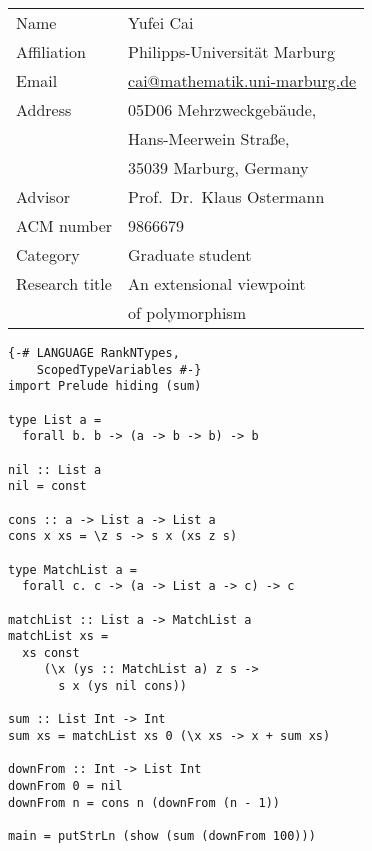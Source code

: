 \documentclass{amsart}
\begin{document}
\thispagestyle{empty}



\def\CT0{$\text{CT}_0$}
\def\DoCap{\captionsetup{justification=raggedright,margin=0pt}}

\def\OK{\\[5pt]}

\def\LeftWidth{0.5\textwidth}
\def\RightWidth{0.5\textwidth}

{
\begin{minipage}{\LeftWidth}
\begin{tabular}{ll}
Name & Yufei Cai\OK
Affiliation & Philipps-Universit\"at Marburg\OK
Email & \url{cai@mathematik.uni-marburg.de} \OK
Address & 05D06 Mehrzweckgeb\"aude,\\
              & Hans-Meerwein Stra\ss e,\\
              & 35039 Marburg, Germany \OK
Advisor & Prof.\ Dr.\ Klaus Ostermann \OK
ACM number & 9866679 \OK
Category & Graduate student \OK
Research title & An extensional viewpoint\\ &of polymorphism
\end{tabular}

\vspace{2.3cm}
\small
\begin{verbatim}
{-# LANGUAGE RankNTypes,
    ScopedTypeVariables #-}
import Prelude hiding (sum)

type List a =
  forall b. b -> (a -> b -> b) -> b

nil :: List a
nil = const

cons :: a -> List a -> List a
cons x xs = \z s -> s x (xs z s)

type MatchList a =
  forall c. c -> (a -> List a -> c) -> c

matchList :: List a -> MatchList a
matchList xs =
  xs const
     (\x (ys :: MatchList a) z s ->
       s x (ys nil cons))

sum :: List Int -> Int
sum xs = matchList xs 0 (\x xs -> x + sum xs)

downFrom :: Int -> List Int
downFrom 0 = nil
downFrom n = cons n (downFrom (n - 1))

main = putStrLn (show (sum (downFrom 100)))
\end{verbatim}

\begingroup
\DoCap
{}
\label{figure1}
\endgroup


\end{minipage}}
\end{document}

